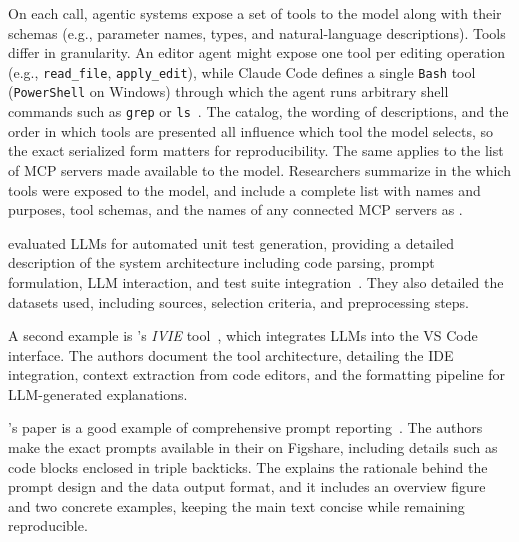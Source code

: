 On each call, agentic systems expose a set of tools to the model along with their schemas (e.g., parameter names, types, and natural-language descriptions).
Tools differ in granularity. An editor agent might expose one tool per editing operation (e.g., \texttt{read\_file}, \texttt{apply\_edit}), while Claude Code defines a single \texttt{Bash} tool (\texttt{PowerShell} on Windows) through which the agent runs arbitrary shell commands such as \texttt{grep} or \texttt{ls}~\cite{anthropic_tools_reference}.
The catalog, the wording of descriptions, and the order in which tools are presented all influence which tool the model selects, so the exact serialized form matters for reproducibility.
The same applies to the list of MCP servers made available to the model.
Researchers \must summarize in the \paper which tools were exposed to the model, and \should include a complete list with names and purposes, tool schemas, and the names of any connected MCP servers as \supplementarymaterial.


\citeauthor{DBLP:journals/tse/SchaferNET24} evaluated LLMs for automated unit test generation, providing a detailed description of the system architecture including code parsing, prompt formulation, LLM interaction, and test suite integration~\cite{DBLP:journals/tse/SchaferNET24}.
They also detailed the datasets used, including sources, selection criteria, and preprocessing steps.

A second example is \citeauthor{DBLP:conf/chi/YanHWH24}'s \emph{IVIE} tool~\cite{DBLP:conf/chi/YanHWH24}, which integrates LLMs into the VS Code interface.
The authors document the tool architecture, detailing the IDE integration, context extraction from code editors, and the formatting pipeline for LLM-generated explanations.

\citeauthor{DBLP:journals/pacmse/LiangBBDFF024}'s paper is a good example of comprehensive prompt reporting~\cite{DBLP:journals/pacmse/LiangBBDFF024}.
The authors make the exact prompts available in their \supplementarymaterial on Figshare, including details such as code blocks enclosed in triple backticks.
The \paper explains the rationale behind the prompt design and the data output format, and it includes an overview figure and two concrete examples, keeping the main text concise while remaining reproducible.

